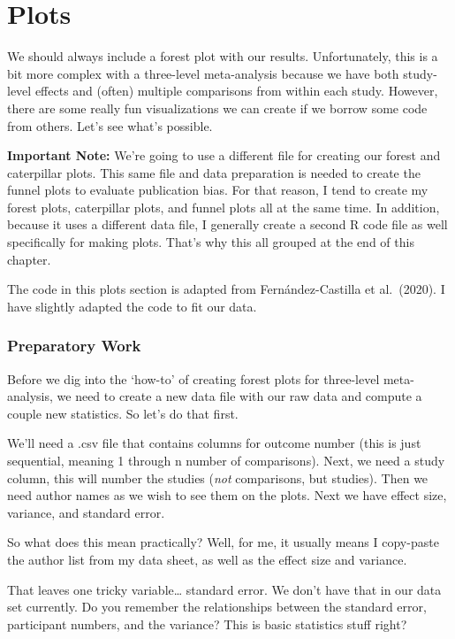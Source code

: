 \documentclass[
]{book}
\begin{document}
\hypertarget{plots}{%
\section{Plots}\label{plots}}

We should always include a forest plot with our results. Unfortunately, this is a bit more complex with a three-level meta-analysis because we have both study-level effects and (often) multiple comparisons from within each study. However, there are some really fun visualizations we can create if we borrow some code from others. Let's see what's possible.

\textbf{Important Note:} We're going to use a different file for creating our forest and caterpillar plots. This same file and data preparation is needed to create the funnel plots to evaluate publication bias. For that reason, I tend to create my forest plots, caterpillar plots, and funnel plots all at the same time. In addition, because it uses a different data file, I generally create a second R code file as well specifically for making plots. That's why this all grouped at the end of this chapter.

The code in this plots section is adapted from Fernández-Castilla et al.~(2020)\citep{fernández-castilla2020}. I have slightly adapted the code to fit our data.

\hypertarget{preparatory-work}{%
\subsubsection{Preparatory Work}\label{preparatory-work}}

Before we dig into the `how-to' of creating forest plots for three-level meta-analysis, we need to create a new data file with our raw data and compute a couple new statistics. So let's do that first.

We'll need a .csv file that contains columns for outcome number (this is just sequential, meaning 1 through n number of comparisons). Next, we need a study column, this will number the studies (\emph{not} comparisons, but studies). Then we need author names as we wish to see them on the plots. Next we have effect size, variance, and standard error.

So what does this mean practically? Well, for me, it usually means I copy-paste the author list from my data sheet, as well as the effect size and variance.

That leaves one tricky variable\ldots{} standard error. We don't have that in our data set currently. Do you remember the relationships between the standard error, participant numbers, and the variance? This is basic statistics stuff right?
\end{document}

